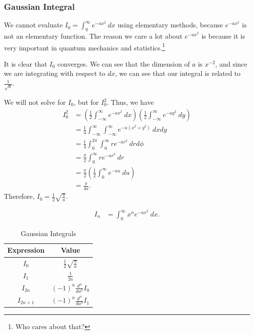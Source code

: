 \documentclass[10pt]{mypackage}
\begin{document}
\subsubsection{Gaussian Integral}%
We cannot evaluate $I_0 = \int_{0}^{\infty} e^{-ax^2}\:dx$ using elementary methods, because $e^{-ax^2}$ is not an elementary function. The reason we care a lot about $e^{-ax^2}$ is because it is very important in quantum mechanics and statistics.\footnote{Who cares about that?}\newline

It is clear that $I_0$ converges. We can see that the dimension of $a$ is $x^{-2}$, and since we are integrating with respect to $dx$, we can see that our integral is related to $\frac{1}{\sqrt{a}}$.
\begin{example}
  We will not solve for $I_0$, but for $I_0^2$. Thus, we have
  \begin{align*}
    I_0^2 &= \left(\frac{1}{2}\int_{-\infty}^{\infty} e^{-ax^2}\:dx\right)\left(\frac{1}{2}\int_{-\infty}^{\infty} e^{-ay^2}\:dy\right)\\
          &= \frac{1}{4}\int_{-\infty}^{\infty}\int_{-\infty}^{\infty} e^{-a\left(x^2 + y^2\right)}\:dxdy\\
          &= \frac{1}{4}\int_{0}^{2\pi}\int_{0}^{\infty} re^{-ar^2}\:drd\phi\\
          &= \frac{\pi}{2}\int_{0}^{\infty} re^{-ar^2}\:dr\\
          &= \frac{\pi}{2}\left(\frac{1}{2}\int_{0}^{\infty} e^{-au}\:du\right)\\
          &= \frac{\pi}{4a}.
  \end{align*}
  Therefore, $I_0 = \frac{1}{2}\sqrt{\frac{\pi}{a}}$.
\end{example}
\begin{definition}
\begin{align*}
  I_n &= \int_{0}^{\infty} x^ne^{-ax^2}\:dx.
\end{align*}
\end{definition}
\begin{table}
  \centering
  \renewcommand{\arraystretch}{1.5}
  \begin{tabular}{c|c}
    Expression & Value\\
    \hline\hline
    $I_0$ & $\frac{1}{2}\sqrt{\frac{\pi}{a}}$\\
    $I_1$ & $\frac{1}{2a}$\\
    $I_{2n}$ & $(-1)^{n}\frac{d^{n}}{da^{n}}I_0$\\
    $I_{2n+1}$ & $\left(-1\right)^{n}\frac{d^{n}}{da^{n}}I_1$
  \end{tabular}
  \caption{Gaussian Integrals}
\end{table}
\end{document}
